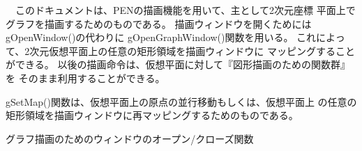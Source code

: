 \documentclass[11pt,a4j]{jarticle}
\newenvironment{itemize2}%
{%
   \begin{list}{$\bullet$\ \ }%
   {%
      \setlength{\itemindent}{0pt}
      \setlength{\leftmargin}{3zw}%
      \setlength{\rightmargin}{0zw}%
      \setlength{\labelsep}{0zw}%
      \setlength{\labelwidth}{3zw}%
      \setlength{\itemsep}{0em}%
      \setlength{\parsep}{0em}%
      \setlength{\listparindent}{0zw}%
   }
}{%
   \end{list}%
}
\begin{document}
　このドキュメントは、PENの描画機能を用いて、主として2次元座標
平面上でグラフを描画するためのものである。
描画ウィンドウを開くためにはgOpenWindow()の代わりに
gOpenGraphWindow()関数を用いる。
これによって、2次元仮想平面上の任意の矩形領域を描画ウィンドウに
マッピングすることができる。
以後の描画命令は、仮想平面に対して『図形描画のための関数群』を
そのまま利用することができる。

gSetMap()関数は、仮想平面上の原点の並行移動もしくは、仮想平面上
の任意の矩形領域を描画ウィンドウに再マッピングするためのものである。

%
%

グラフ描画のためのウィンドウのオープン/クローズ関数 
\end{document}
